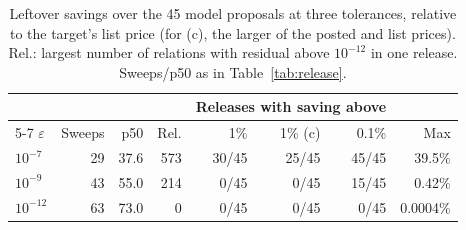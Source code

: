 \begin{table}[t]
\centering
\caption{Leftover savings over the 45 model proposals at three tolerances, relative to the target's list price (for (c), the larger of the posted and list prices). Rel.: largest number of relations with residual above $10^{-12}$ in one release. Sweeps/p50 as in Table~\ref{tab:release}.}
\label{tab:tolerance}
\footnotesize
\setlength{\tabcolsep}{3pt}
\begin{tabular}{@{}lrrrrrrr@{}}
\toprule
 & & & & \multicolumn{3}{c}{Releases with saving above} & \\
\cmidrule(lr){5-7}
$\varepsilon$ & Sweeps & p50 & Rel. & 1\% & 1\% (c) & 0.1\% & Max \\
\midrule
$10^{-7}$ & 29 & 37.6 & 573 & 30/45 & 25/45 & 45/45 & 39.5\% \\
$10^{-9}$ & 43 & 55.0 & 214 & 0/45 & 0/45 & 15/45 & 0.42\% \\
$10^{-12}$ & 63 & 73.0 & 0 & 0/45 & 0/45 & 0/45 & 0.0004\% \\
\bottomrule
\end{tabular}
\end{table}
